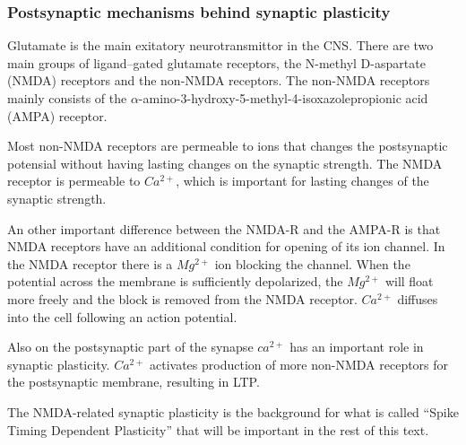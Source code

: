


\subsubsection{Postsynaptic mechanisms behind synaptic plasticity}
Glutamate is the main exitatory neurotransmittor in the CNS\cite{PrinciplesOfAnatomyAndPhysiology12edKAP12}. %
There are two main groups of ligand--gated glutamate receptors, the N-methyl D-aspartate (NMDA) receptors and the non-NMDA receptors. 
The non-NMDA receptors mainly consists of the $\alpha$-amino-3-hydroxy-5-methyl-4-isoxazolepropionic acid (AMPA) receptor.

Most non-NMDA receptors are permeable to ions that changes the postsynaptic potensial without having lasting changes on the synaptic strength.%
The NMDA receptor is permeable to $Ca^{2+}$, which is important for lasting changes of the synaptic strength. %

An other important difference between the NMDA-R and the AMPA-R is that NMDA receptors have an additional condition for opening of its ion channel. 
In the NMDA receptor there is a $Mg^{2+}$ ion blocking the channel. 
When the potential across the membrane is sufficiently depolarized, the $Mg^{2+}$ will float more freely and the block is removed from the NMDA receptor.
$Ca^{2+}$ diffuses into the cell following an action potential\cite{PrinciplesOfNeuralScience4edKAP12}.

Also on the postsynaptic part of the synapse $ca^{2+}$ has an important role in synaptic plasticity. 
$Ca^{2+}$ activates production of more non-NMDA receptors for the postsynaptic membrane, resulting in LTP\cite{AMPARtrafficingArtikkel}.%

The NMDA-related synaptic plasticity is the background for what is called ``Spike Timing Dependent Plasticity'' that will be important in the rest of this text.









